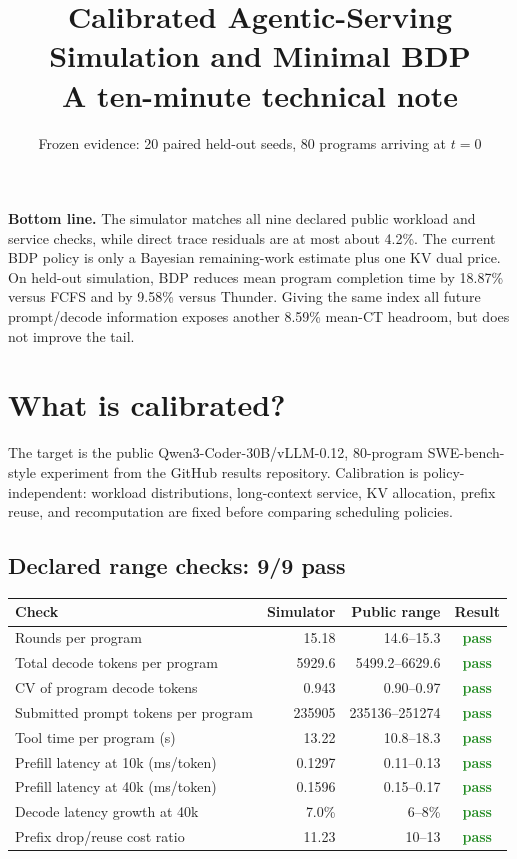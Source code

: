 \documentclass[10pt]{article}
\title{\vspace{-1.4em}\textbf{Calibrated Agentic-Serving Simulation and Minimal BDP}\\
\large A ten-minute technical note}
\author{}
\date{Frozen evidence: 20 paired held-out seeds, 80 programs arriving at $t=0$}
\newcommand{\keybox}[1]{%
  \begin{center}
  \colorbox{softblue}{\parbox{0.94\linewidth}{\small #1}}
  \end{center}}
\newcommand{\good}[1]{\textcolor{ForestGreen}{\textbf{#1}}}
\begin{document}
\maketitle
\vspace{-1.8em}

\keybox{\textbf{Bottom line.} The simulator matches all nine declared public workload and service checks, while direct trace residuals are at most about 4.2\%. The current BDP policy is only a Bayesian remaining-work estimate plus one KV dual price. On held-out simulation, BDP reduces mean program completion time by 18.87\% versus FCFS and by 9.58\% versus Thunder. Giving the same index all future prompt/decode information exposes another 8.59\% mean-CT headroom, but does not improve the tail.}

\section{What is calibrated?}

The target is the public Qwen3-Coder-30B/vLLM-0.12, 80-program SWE-bench-style experiment from the GitHub results repository. Calibration is policy-independent: workload distributions, long-context service, KV allocation, prefix reuse, and recomputation are fixed before comparing scheduling policies.

\subsection*{Declared range checks: 9/9 pass}

\begin{table}[h]
\centering
\small
\begin{tabularx}{\linewidth}{>{\raggedright\arraybackslash}X r r c}
\toprule
Check & Simulator & Public range & Result \\
\midrule
Rounds per program & 15.18 & 14.6--15.3 & \good{pass} \\
Total decode tokens per program & 5929.6 & 5499.2--6629.6 & \good{pass} \\
CV of program decode tokens & 0.943 & 0.90--0.97 & \good{pass} \\
Submitted prompt tokens per program & 235905 & 235136--251274 & \good{pass} \\
Tool time per program (s) & 13.22 & 10.8--18.3 & \good{pass} \\
Prefill latency at 10k (ms/token) & 0.1297 & 0.11--0.13 & \good{pass} \\
Prefill latency at 40k (ms/token) & 0.1596 & 0.15--0.17 & \good{pass} \\
Decode latency growth at 40k & 7.0\% & 6--8\% & \good{pass} \\
Prefix drop/reuse cost ratio & 11.23 & 10--13 & \good{pass} \\
\bottomrule
\end{tabularx}
\end{table}
\end{document}
